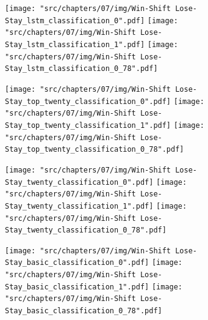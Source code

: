 \begin{figure}[!htbp]
    \begin{subfigure}{\textwidth}
        \texttt{[image: "src/chapters/07/img/Win-Shift Lose-Stay\_lstm\_classification\_0".pdf]}
        \texttt{[image: "src/chapters/07/img/Win-Shift Lose-Stay\_lstm\_classification\_1".pdf]}
        \texttt{[image: "src/chapters/07/img/Win-Shift Lose-Stay\_lstm\_classification\_0\_78".pdf]}
    \end{subfigure}
    \begin{subfigure}{\textwidth}
        \texttt{[image: "src/chapters/07/img/Win-Shift Lose-Stay\_top\_twenty\_classification\_0".pdf]}
        \texttt{[image: "src/chapters/07/img/Win-Shift Lose-Stay\_top\_twenty\_classification\_1".pdf]}
        \texttt{[image: "src/chapters/07/img/Win-Shift Lose-Stay\_top\_twenty\_classification\_0\_78".pdf]}
    \end{subfigure}
    \begin{subfigure}{\textwidth}
        \texttt{[image: "src/chapters/07/img/Win-Shift Lose-Stay\_twenty\_classification\_0".pdf]}
        \texttt{[image: "src/chapters/07/img/Win-Shift Lose-Stay\_twenty\_classification\_1".pdf]}
        \texttt{[image: "src/chapters/07/img/Win-Shift Lose-Stay\_twenty\_classification\_0\_78".pdf]}
    \end{subfigure}
    \begin{subfigure}{\textwidth}
        \texttt{[image: "src/chapters/07/img/Win-Shift Lose-Stay\_basic\_classification\_0".pdf]}
        \texttt{[image: "src/chapters/07/img/Win-Shift Lose-Stay\_basic\_classification\_1".pdf]}
        \texttt{[image: "src/chapters/07/img/Win-Shift Lose-Stay\_basic\_classification\_0\_78".pdf]}
    \end{subfigure}
\end{figure}

